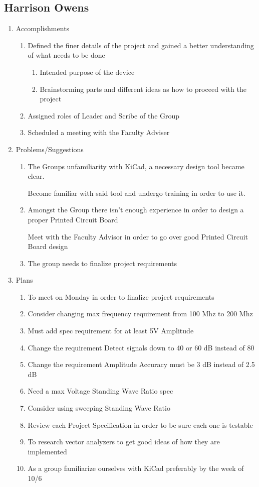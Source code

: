 \documentclass{article}
\begin{document}
\subsection*{Harrison Owens}
\begin{enumerate}
\item{Accomplishments
    \begin{enumerate}
    \item{Defined the finer details of the project and gained a better understanding of what needs to be done
        \begin{enumerate}
        \item{Intended purpose of the device}
        \item{Brainstorming parts and different ideas as how to proceed with the project}
        \end{enumerate}
    }
    \item{Assigned roles of Leader and Scribe of the Group}
    \item{Scheduled a meeting with the Faculty Adviser}
    \end{enumerate}
}
\item{Problems/Suggestions
    \begin{enumerate}
    \item{The Groups unfamiliarity with KiCad, a necessary design tool became clear.

    Become familiar with said tool and undergo training in order to use it.}
    \item{Amongst the Group there isn’t enough experience in order to design a proper Printed Circuit Board

    Meet with the Faculty Advisor in order to go over good Printed Circuit Board design}
    \item{The group needs to finalize project requirements}
    \end{enumerate}
}
\item{Plans
    \begin{enumerate}
    \item{To meet on Monday in order to finalize project requirements}
    \item{Consider changing max frequency requirement from 100 Mhz to 200 Mhz}
    \item{Must add spec requirement for at least 5V Amplitude}
    \item{Change the requirement Detect signals down to 40 or 60 dB instead of 80}
    \item{Change the requirement Amplitude Accuracy must be 3 dB instead of 2.5 dB}
    \item{Need a max Voltage Standing Wave Ratio spec}
    \item{Consider using sweeping Standing Wave Ratio}
    \item{Review each Project Specification in order to be sure each one is testable}
    \item{To research vector analyzers to get good ideas of how they are implemented}
    \item{As a group familiarize ourselves with KiCad preferably by the week of 10/6}
    \end{enumerate}
}
\end{enumerate}
\end{document}
